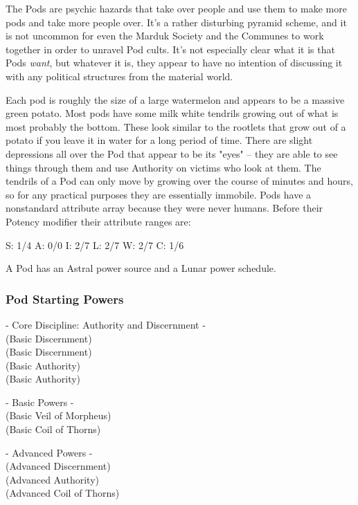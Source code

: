 The Pods are psychic hazards that take over people and use them to make more pods and take more people over. It's a rather disturbing pyramid scheme, and it is not uncommon for even the Marduk Society and the Communes to work together in order to unravel Pod cults. It's not especially clear what it is that Pods \textit{want}, but whatever it is, they appear to have no intention of discussing it with any political structures from the material world.

Each pod is roughly the size of a large watermelon and appears to be a massive green potato. Most pods have some milk white tendrils growing out of what is most probably the bottom. These look similar to the rootlets that grow out of a potato if you leave it in water for a long period of time. There are slight depressions all over the Pod that appear to be its "eyes" -- they are able to see things through them and use Authority on victims who look at them. The tendrils of a Pod can only move by growing over the course of minutes and hours, so for any practical purposes they are essentially immobile. Pods have a nonstandard attribute array because they were never humans. Before their Potency modifier their attribute ranges are:

S: 1/4 A: 0/0 I: 2/7 L: 2/7 W: 2/7 C: 1/6

A Pod has an Astral power source and a Lunar power schedule.

\subsubsection{Pod Starting Powers}

\hspace{\parindent} - Core Discipline: Authority and Discernment -\\
 (Basic Discernment)\\
 (Basic Discernment)\\
 (Basic Authority)\\
 (Basic Authority)

- Basic Powers -\\
 (Basic Veil of Morpheus)\\
 (Basic Coil of Thorns)

- Advanced Powers -\\
 (Advanced Discernment)\\
 (Advanced Authority)\\
 (Advanced Coil of Thorns)

